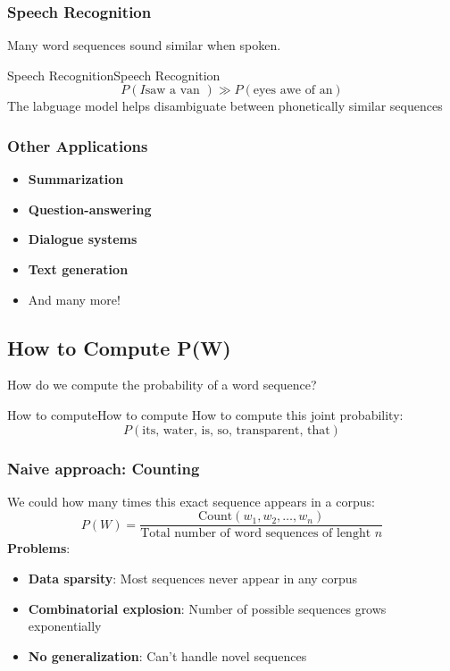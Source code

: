 \documentclass[a4paper]{article}
\theoremstyle{definition}
\begin{document}
\subsubsection{Speech Recognition}
Many word sequences sound similar when spoken.
\begin{example}{Speech Recognition}{Speech Recognition}
\[
  P(I \text{saw a van }) \gg P(\text{eyes awe of an})
\]
The labguage model helps disambiguate between phonetically similar sequences
\end{example}
\subsubsection{Other Applications}
\begin{itemize}
    \item \textbf{Summarization}
    \item \textbf{Question-answering}
    \item \textbf{Dialogue systems}
    \item \textbf{Text generation}
    \item And many more!
\end{itemize}
\subsection{How to Compute P(W)}
How do we compute the probability of a word sequence?
\begin{example}{How to compute}{How to compute}
How to compute this joint probability:
\[
  P(\text{its, water, is, so, transparent, that})
\]
\end{example}
\subsubsection{Naive approach: Counting}
We could how many times this exact sequence appears in a corpus:
\[
    P(W) = \frac{\text{Count}(w_1,w_2,\ldots,w_n)}{\text{Total number of word sequences of lenght } n}
\]
\textbf{Problems}:
\begin{itemize}
    \item \textbf{Data sparsity}: Most sequences never appear in any corpus
    \item \textbf{Combinatorial explosion}: Number of possible sequences grows exponentially 
    \item \textbf{No generalization}: Can't handle novel sequences
\end{itemize}
\end{document}
